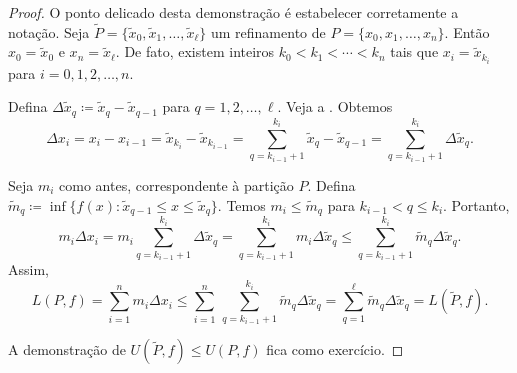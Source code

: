 \begin{proof}
O ponto delicado desta demonstração é estabelecer corretamente a notação.
Seja $\widetilde{P} = \{ \widetilde{x}_0, \widetilde{x}_1, \ldots,
\widetilde{x}_{\ell} \}$ um refinamento de
$P = \{ x_0, x_1, \ldots, x_n \}$. Então
$x_0 = \widetilde{x}_0$ e
$x_n = \widetilde{x}_{\ell}$. De fato, existem inteiros
$k_0 < k_1 < \cdots < k_n$ tais que $x_i = \widetilde{x}_{k_i}$ para
$i=0,1,2,\ldots,n$.

Defina $\Delta \widetilde{x}_q \coloneqq \widetilde{x}_q - \widetilde{x}_{q-1}$ para
$q=1,2,\ldots,\ell$.
Veja a .
Obtemos
\begin{equation*}
\Delta x_i
=
x_i - x_{i-1} =
\widetilde{x}_{k_i} - \widetilde{x}_{k_{i-1}} =
\sum_{q=k_{i-1}+1}^{k_i} 
\widetilde{x}_{q} - \widetilde{x}_{q-1}
=
\sum_{q=k_{i-1}+1}^{k_i} \Delta \widetilde{x}_q .
\end{equation*}
\begin{myfigureht}
\caption{Refinamento de um subintervalo. Observe que $\Delta x_i =
\Delta \widetilde{x}_{q-2} +
\Delta \widetilde{x}_{q-1} +
\Delta \widetilde{x}_{q}$,
e também que
$k_{i-1}+1 = q-2$ e
$k_{i} = q$.\label{fig:refinement}}
\end{myfigureht}

Seja $m_i$ como antes, correspondente à partição $P$.
Defina $\widetilde{m}_q \coloneqq \inf \bigl\{ f(x) : \widetilde{x}_{q-1} \leq x \leq
\widetilde{x}_q \bigr\}$.
Temos $m_i \leq \widetilde{m}_q$ para $k_{i-1} < q \leq k_i$. Portanto,
\begin{equation*}
m_i \Delta x_i
=
m_i \sum_{q=k_{i-1}+1}^{k_i} \Delta \widetilde{x}_q
=
\sum_{q=k_{i-1}+1}^{k_i} m_i \Delta \widetilde{x}_q
\leq
\sum_{q=k_{i-1}+1}^{k_i} \widetilde{m}_q \Delta \widetilde{x}_q .
\end{equation*}
Assim,
\begin{equation*}
L(P,f) =
\sum_{i=1}^n m_i \Delta x_i
\leq
\sum_{i=1}^n \,
\sum_{q=k_{i-1}+1}^{k_i} \widetilde{m}_q \Delta \widetilde{x}_q
=
\sum_{q=1}^{\ell}
\widetilde{m}_q \Delta \widetilde{x}_q = L(\widetilde{P},f).
\end{equation*}

A demonstração de $U(\widetilde{P},f) \leq U(P,f)$ fica como exercício.
\end{proof}

